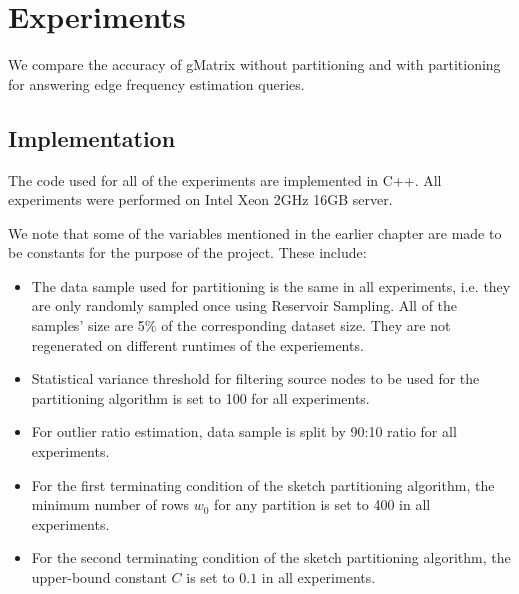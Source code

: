 \chapter{Experiments}

\ifpdf
    \graphicspath{{Chapter3/Figs/Raster/}{Chapter3/Figs/PDF/}{Chapter3/Figs/}}
\else
    \graphicspath{{Chapter3/Figs/Vector/}{Chapter3/Figs/}}
\fi

We compare the accuracy of gMatrix without partitioning and with partitioning for answering edge frequency estimation queries.

\section{Implementation}
The code used for all of the experiments are implemented in C++. All experiments were performed on Intel Xeon 2GHz 16GB server.

We note that some of the variables mentioned in the earlier chapter are made to be constants for the purpose of the project. These include:

\begin{itemize}
\item The data sample used for partitioning is the same in all experiments, i.e. they are only randomly sampled once using Reservoir Sampling. All of the samples' size are 5\% of the corresponding dataset size. They are not regenerated on different runtimes of the experiements.
\item Statistical variance threshold for filtering source nodes to be used for the partitioning algorithm is set to 100 for all experiments.
\item For outlier ratio estimation, data sample is split by 90:10 ratio for all experiments.
\item For the first terminating condition of the sketch partitioning algorithm, the minimum number of rows $w_0$ for any partition is set to 400 in all experiments.
\item For the second terminating condition of the sketch partitioning algorithm, the upper-bound constant $C$ is set to $0.1$ in all experiments.
\end{itemize}

